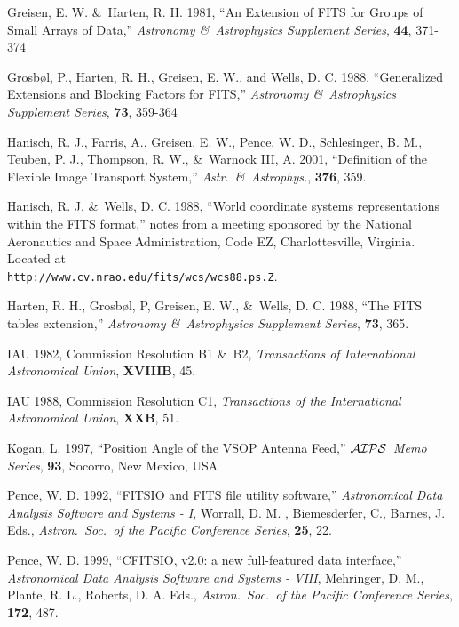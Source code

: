 \documentclass[twoside]{article}
\newcommand{\AIPS}{{$\cal AIPS\/$}}
\newcommand{\keyw}[1]{\hbox{{\tt #1}}}
\begin{document}
\begin{thebibliography}{99}
  Greisen, E. W. \&\ Harten, R. H. 1981, ``An Extension of FITS for
  Groups of Small Arrays of Data,'' {\it Astronomy \&\ Astrophysics
  Supplement Series}, {\bf 44}, 371-374

  Grosb\o l, P., Harten, R. H., Greisen, E. W., and Wells, D. C. 1988,
  ``Generalized Extensions and Blocking Factors for FITS,'' {\it
  Astronomy \&\ Astrophysics Supplement Series}, {\bf 73}, 359-364

   Hanisch, R. J., Farris, A., Greisen, E. W., Pence, W. D.,
   Schlesinger, B. M., Teuben, P. J., Thompson, R. W., \&\ Warnock
   III, A. 2001, ``Definition of the Flexible Image Transport
   System,'' {\it Astr.~\&\ Astrophys.}, {\bf 376}, 359.

   Hanisch, R. J. \&\ Wells, D. C. 1988, ``World coordinate systems
   representations within the FITS format,'' notes from a meeting
   sponsored by the National Aeronautics and Space Administration,
   Code EZ, Charlottesville, Virginia.  Located at \\
   \keyw{http://www.cv.nrao.edu/fits/wcs/wcs88.ps.Z}.

   Harten, R. H., Grosb\o l, P, Greisen, E. W., \&\ Wells, D. C. 1988,
   ``The FITS tables extension,'' {\it Astronomy \&\ Astrophysics
     Supplement Series}, {\bf 73}, 365.

   IAU 1982, Commission Resolution B1 \&\ B2, {\it Transactions of
   International Astronomical Union}, {\bf XVIIIB}, 45.

   IAU 1988, Commission Resolution C1, {\it Transactions of the
   International Astronomical Union}, {\bf XXB}, 51.

   Kogan, L. 1997, ``Position Angle of the VSOP Antenna Feed,''
   {\it \AIPS\ Memo Series}, {\bf 93}, Socorro, New Mexico, USA

   Pence, W. D. 1992, ``FITSIO and FITS file utility software,'' {\it
   Astronomical Data Analysis Software and Systems - I}, Worrall, D.
   M. , Biemesderfer, C., Barnes, J. Eds., {\it Astron.~Soc.~of the
   Pacific Conference Series}, {\bf 25}, 22.

   Pence, W. D. 1999, ``CFITSIO, v2.0: a new full-featured data
   interface,'' {\it Astronomical Data Analysis Software and Systems -
   VIII}, Mehringer, D. M., Plante, R. L., Roberts, D. A. Eds., {\it
   Astron.~Soc.~of the Pacific Conference Series}, {\bf 172}, 487.


\end{thebibliography}
\end{document}
